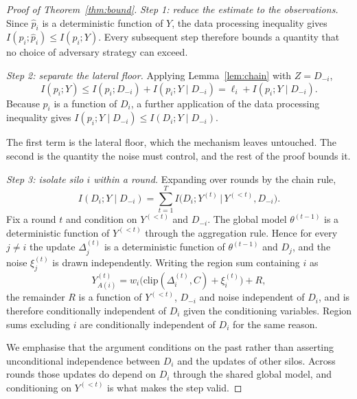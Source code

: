 \documentclass[acmsmall,screen,review,anonymous]{acmart}
\theoremstyle{acmdefinition}%
\begin{document}
\begin{proof}[Proof of Theorem~\ref{thm:bound}]
\emph{Step 1: reduce the estimate to the observations.}
Since $\hat{p}_i$ is a deterministic function of $Y$, the data processing
inequality gives $I(p_i ; \hat{p}_i) \le I(p_i ; Y)$. Every subsequent step
therefore bounds a quantity that no choice of adversary strategy can exceed.

\emph{Step 2: separate the lateral floor.} Applying
Lemma~\ref{lem:chain} with $Z = D_{-i}$,
\begin{equation}
I(p_i ; Y) \le I(p_i ; D_{-i}) + I(p_i ; Y \mid D_{-i})
= \ell_i + I(p_i ; Y \mid D_{-i}).
\end{equation}
Because $p_i$ is a function of $D_i$, a further application of the data processing
inequality gives $I(p_i ; Y \mid D_{-i}) \le I(D_i ; Y \mid D_{-i})$.

The first term is the lateral floor, which the mechanism leaves untouched. The
second is the quantity the noise must control, and the rest of the proof bounds it.

\emph{Step 3: isolate silo $i$ within a round.} Expanding over rounds by the chain rule,
\begin{equation}
I(D_i ; Y \mid D_{-i}) = \sum_{t=1}^{T} I\big(D_i ; Y^{(t)} \,\big|\, Y^{(<t)}, D_{-i}\big).
\end{equation}
Fix a round $t$ and condition on $Y^{(<t)}$ and $D_{-i}$. The global model
$\theta^{(t-1)}$ is a deterministic function of $Y^{(<t)}$ through the aggregation
rule. Hence for every $j \ne i$ the update $\Delta_j^{(t)}$ is a deterministic
function of $\theta^{(t-1)}$ and $D_j$, and the noise $\xi_j^{(t)}$ is drawn
independently. Writing the region sum containing $i$ as
\begin{equation}
Y_{A(i)}^{(t)} = w_i \big(\mathrm{clip}(\Delta_i^{(t)}, C) + \xi_i^{(t)}\big) + R,
\end{equation}
the remainder $R$ is a function of $Y^{(<t)}$, $D_{-i}$ and noise independent of
$D_i$, and is therefore conditionally independent of $D_i$ given the conditioning
variables. Region sums excluding $i$ are conditionally independent of $D_i$ for
the same reason.

We emphasise that the argument conditions on the past rather than asserting
unconditional independence between $D_i$ and the updates of other silos. Across
rounds those updates do depend on $D_i$ through the shared global model, and
conditioning on $Y^{(<t)}$ is what makes the step valid.


\end{proof}
\end{document}
